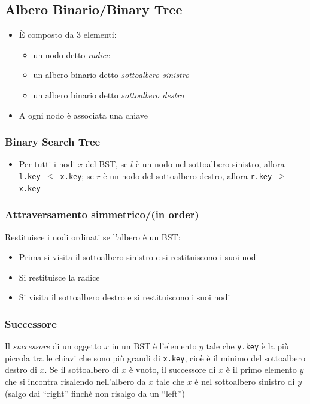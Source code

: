 \documentclass[10pt,a4paper]{article}
\newcommand{\code}{\texttt}
\begin{document}
\begin{multicols*}{2}
\subsection*{Albero Binario/Binary Tree}
\begin{itemize}
    \item \`E composto da 3 elementi:
    \begin{itemize}
        \item un nodo detto \emph{radice}
        \item un albero binario detto \emph{sottoalbero sinistro}
        \item un albero binario detto \emph{sottoalbero destro}
    \end{itemize}
    \item A ogni nodo è associata una chiave
\end{itemize}
\subsubsection*{Binary Search Tree}
\begin{itemize}
    \item Per tutti i nodi $x$ del BST, se $l$ è un nodo nel sottoalbero sinistro, allora \code{l.key $\le$ x.key}; se $r$ è un nodo del sottoalbero destro, allora \code{r.key $\ge$ x.key}
\end{itemize}

\subsubsection*{Attraversamento simmetrico/(in order)}
Restituisce i nodi ordinati se l'albero è un BST:
\begin{itemize}
    \item Prima si visita il sottoalbero sinistro e si restituiscono i suoi nodi
    \item Si restituisce la radice
    \item Si visita il sottoalbero destro e si restituiscono i suoi nodi
\end{itemize}
    
\subsubsection*{Successore}
Il \emph{successore} di un oggetto $x$ in un BST è l'elemento $y$ tale che \code{y.key} è la più piccola tra le chiavi che sono più grandi di \code{x.key}, cioè è il minimo del sottoalbero destro di $x$. Se il sottoalbero di $x$ è vuoto, il successore di $x$ è il primo elemento $y$ che si incontra risalendo nell'albero da $x$ tale che $x$ è nel sottoalbero sinistro di $y$ (\small{salgo dai ``right'' finchè non risalgo da un ``left''})


\end{multicols*}
\end{document}
